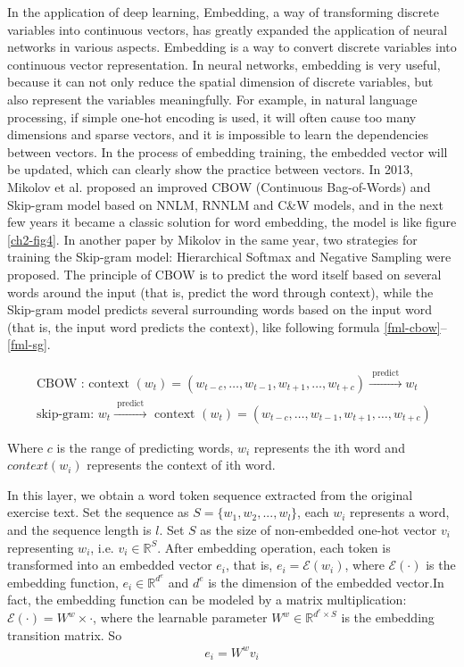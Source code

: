 In the application of deep learning, Embedding, a way of transforming discrete variables into continuous vectors, has greatly expanded the application of neural networks in various aspects. Embedding is a way to convert discrete variables into continuous vector representation. In neural networks, embedding is very useful, because it can not only reduce the spatial dimension of discrete variables, but also represent the variables meaningfully. For example, in natural language processing, if simple one-hot encoding is used, it will often cause too many dimensions and sparse vectors, and it is impossible to learn the dependencies between vectors. In the process of embedding training, the embedded vector will be updated, which can clearly show the practice between vectors. In 2013, Mikolov et al. proposed an improved CBOW (Continuous Bag-of-Words) and Skip-gram model based on NNLM, RNNLM and C\&W models\cite{mikolov2013efficient}, and in the next few years it became a classic solution for word embedding, the model is like figure \ref{ch2-fig4}. In another paper by Mikolov in the same year, two strategies for training the Skip-gram model: Hierarchical Softmax and Negative Sampling were proposed\cite{mikolov2013distributed}. The principle of CBOW is to predict the word itself based on several words around the input (that is, predict the word through context), while the Skip-gram model predicts several surrounding words based on the input word (that is, the input word predicts the context), like following formula \ref{fml-cbow}--\ref{fml-sg}.

\begin{align}
	\text { CBOW : context }(w_{t})=(w_{t-c}, \ldots, w_{t-1}, w_{t+1}, \ldots, w_{t+c}) \stackrel{\text { predict }}{\longrightarrow} w_{t} \label{fml-cbow} \\
	\text { skip-gram: } w_{t} \stackrel{\text { predict }}{\longrightarrow} \text { context }(w_{t})=(w_{t-c}, \ldots, w_{t-1}, w_{t+1}, \ldots, w_{t+c}) \label{fml-sg}
\end{align}

Where \(c\) is the range of predicting words, \(w_i\) represents the ith word and \(context(w_i)\) represents the context of ith word.

In this layer, we obtain a word token sequence extracted from the original exercise text. Set the sequence as \(S=\{w_1,w_2,...,w_l\}\), each \(w_i\) represents a word, and the sequence length is \(l\). Set \(S\) as the size of non-embedded one-hot vector \(v_i\) representing \(w_i\), i.e. \(v_i\in \mathbb{R}^{S}\). After embedding operation, each token is transformed into an embedded vector \(e_i\), that is, \(e_i=\mathcal{E}(w_i)\), where \(\mathcal{E}(\cdot)\) is the embedding function, \(e_i\in \mathbb{R}^{d^{e}}\) and \(d^e\) is the dimension of the embedded vector.In fact, the embedding function can be modeled by a matrix multiplication: \(\mathcal {E} (\cdot) = W^w\times \cdot\), where the learnable parameter \(W^w\in \mathbb {R} ^ {d^{e}\times S}\) is the embedding transition matrix. So
\begin{align}
	e_i = W^w v_i
\end{align}

